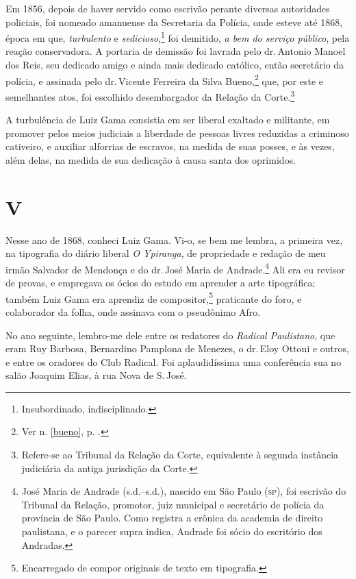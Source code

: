 Em 1856, depois de haver servido como escrivão perante diversas
autoridades policiais, foi nomeado amanuense da Secretaria da Polícia,
onde esteve até 1868, época em que, \emph{turbulento} e
\emph{sedicioso},\footnote{Insubordinado, indisciplinado.} foi
demitido, \emph{a bem do serviço público}, pela reação conservadora. A
portaria de demissão foi lavrada pelo dr.\,Antonio Manoel dos Reis, seu
dedicado amigo e ainda mais dedicado católico, então secretário da
polícia, e assinada pelo dr.\,Vicente Ferreira da Silva Bueno,\footnote{
  Ver n. \ref{bueno}, p. \pageref{bueno}.} que, por este e
semelhantes atos, foi escolhido desembargador da Relação da
Corte.\footnote{Refere-se ao Tribunal da Relação da Corte, equivalente
  à segunda instância judiciária da antiga jurisdição da Corte.}

A turbulência de Luiz Gama consistia em ser liberal exaltado e
militante, em promover pelos meios judiciais a liberdade de pessoas
livres reduzidas a criminoso cativeiro, e auxiliar alforrias de
escravos, na medida de suas posses, e às vezes, além delas, na medida de
sua dedicação à causa santa dos oprimidos.

\section*{V}

Nesse ano de 1868, conheci Luiz Gama. Vi-o, se bem me lembra, a primeira
vez, na tipografia do diário liberal \emph{O Ypiranga}, de propriedade e
redação de meu irmão Salvador de Mendonça e do dr.\,José Maria de
Andrade.\footnote{José Maria de Andrade (s.d.--s.d.), nascido em São %
  Paulo (\textsc{sp}), foi escrivão do Tribunal da Relação, promotor, juiz
  municipal e secretário de polícia da província de São Paulo. Como
  registra a crônica da academia de direito paulistana, e o parecer
  supra indica, Andrade foi sócio do escritório dos Andradas.} Ali era
eu revisor de provas, e empregava os ócios do estudo em aprender a arte
tipográfica; também Luiz Gama era aprendiz de compositor,\footnote{
  Encarregado de compor originais de texto em tipografia.} praticante
do foro, e colaborador da folha, onde assinava com o pseudônimo
Afro.

No ano seguinte, lembro-me dele entre os redatores do \emph{Radical
Paulistano}, que eram Ruy Barbosa, Bernardino Pamplona de Menezes, o dr.\,Eloy Ottoni e outros, e entre os oradores do Club Radical. Foi
aplaudidíssima uma conferência sua no salão Joaquim Elias, à rua Nova de
S.\,José.

